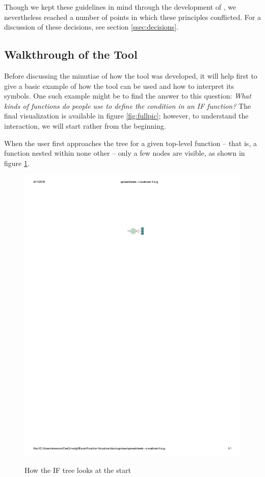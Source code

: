 \documentclass[conference]{IEEEtran}
\begin{document}
	Though we kept these guidelines in mind through the development of \toolname, we
	nevertheless reached a number of points in which these principles conflicted. For
	a discussion of these decisions, see section \ref{ssec:decisions}.
	
	\subsection{Walkthrough of the Tool} Before discussing the minutiae of how the tool
	was developed, it will help first to give a basic example of how the tool can
	be used and how to interpret its symbols. One such example might be to find the
	answer to this question: \textit{ What kinds of functions do people use to
		define the condition in an IF function?} The final visualization is available
	in figure \ref{fig:fullpic}; however, to understand the interaction, we will
	start rather from the beginning. \par
	
	When the user first approaches the tree for a given top-level function -- that
	is, a function nested within none other -- only a few nodes are visible, as
	shown in figure \ref{fig:startpic}. \par
	
	\begin{figure} \centering \includegraphics{start} \label{fig:startpic}
		\caption{How the IF tree looks at the start} \end{figure}
	
\end{document}
